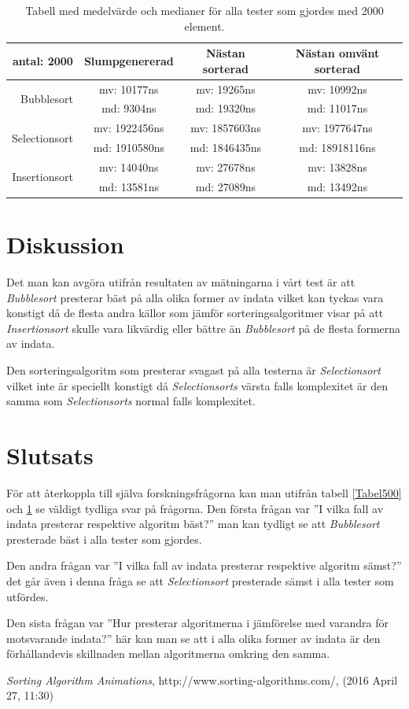 \documentclass[a4paper]{article}
\begin{document}
\begin{table}[H]
	\begin{tabular}{r|c|c|c|}
		antal: 2000 & Slumpgenererad & Nästan sorterad & Nästan omvänt sorterad \\ \hline
		\multirow{2}{*}{Bubblesort}    & mv: 10177ns & mv: 19265ns & mv: 10992ns \\
		                               & md: 9304ns & md: 19320ns & md: 11017ns \\ \hline
		\multirow{2}{*}{Selectionsort} & mv: 1922456ns & mv: 1857603ns & mv: 1977647ns \\
		                               & md: 1910580ns & md: 1846435ns & md: 18918116ns \\ \hline
		\multirow{2}{*}{Insertionsort} & mv: 14040ns & mv: 27678ns & mv: 13828ns \\
		                               & md: 13581ns & md: 27089ns & md: 13492ns \\ \hline	
	\end{tabular}
	\caption{Tabell med medelvärde och medianer för alla tester som gjordes med 2000 element.}
	\label{Tabel2000}
\end{table}

\section{Diskussion}
Det man kan avgöra utifrån resultaten av mätningarna i vårt test är att \emph{Bubblesort} presterar bäst på alla olika former av indata vilket kan tyckas vara konstigt då de flesta andra källor som jämför sorteringsalgoritmer visar på att \emph{Insertionsort} skulle vara likvärdig eller bättre än \emph{Bubblesort} på de flesta formerna av indata.

Den sorteringsalgoritm som presterar svagast på alla testerna är \emph{Selectionsort} vilket inte är speciellt konstigt då \emph{Selectionsorts} värsta falls komplexitet är den samma som \emph{Selectionsorts} normal falls komplexitet. 

\section{Slutsats}
För att återkoppla till själva forskningsfrågorna kan man utifrån tabell \ref{Tabel500} och \ref{Tabel2000} se väldigt tydliga svar på frågorna. Den första frågan var ''I vilka fall av indata presterar respektive algoritm bäst?'' man kan tydligt se att \emph{Bubblesort} presterade bäst i alla tester som gjordes.

Den andra frågan var ''I vilka fall av indata presterar respektive algoritm sämst?'' det går även i denna fråga se att \emph{Selectionsort} presterade sämst i alla tester som utfördes.

Den sista frågan var ''Hur presterar algoritmerna i jämförelse med varandra för motsvarande indata?'' här kan man se att i alla olika former av indata är den förhållandevis skillnaden mellan algoritmerna omkring den samma.

\begin{thebibliography}{99}
	 \emph{Sorting Algorithm Animations}, http://www.sorting-algorithms.com/, (2016 April 27, 11:30)
\end{thebibliography}
\end{document}
